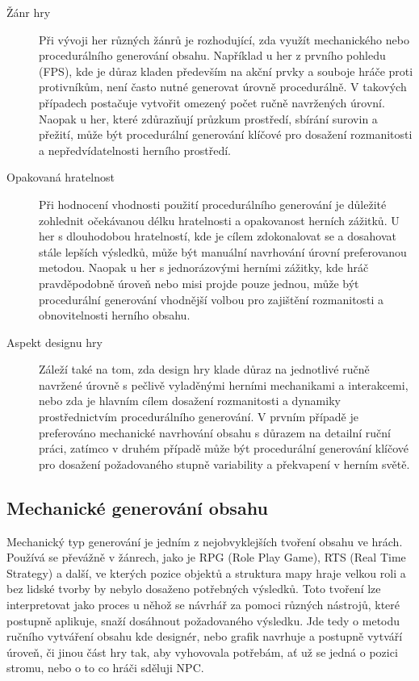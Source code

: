 \begin{description}
\item[Žánr hry] Při vývoji her různých žánrů je rozhodující, zda využít mechanického nebo procedurálního generování obsahu. Například u her z prvního pohledu (FPS), kde je důraz kladen především na akční prvky a souboje hráče proti protivníkům, není často nutné generovat úrovně procedurálně. V takových případech postačuje vytvořit omezený počet ručně navržených úrovní. Naopak u her, které zdůrazňují průzkum prostředí, sbírání surovin a přežití, může být procedurální generování klíčové pro dosažení rozmanitosti a nepředvídatelnosti herního prostředí.

\item[Opakovaná hratelnost] Při hodnocení vhodnosti použití procedurálního generování je důležité zohlednit očekávanou délku hratelnosti a opakovanost herních zážitků. U her s dlouhodobou hratelností, kde je cílem zdokonalovat se a dosahovat stále lepších výsledků, může být manuální navrhování úrovní preferovanou metodou. Naopak u her s jednorázovými herními zážitky, kde hráč pravděpodobně úroveň nebo misi projde pouze jednou, může být procedurální generování vhodnější volbou pro zajištění rozmanitosti a obnovitelnosti herního obsahu.

\item[Aspekt designu hry] Záleží také na tom, zda design hry klade důraz na jednotlivé ručně navržené úrovně s pečlivě vyladěnými herními mechanikami a interakcemi, nebo zda je hlavním cílem dosažení rozmanitosti a dynamiky prostřednictvím procedurálního generování. V prvním případě je preferováno mechanické navrhování obsahu s důrazem na detailní ruční práci, zatímco v druhém případě může být procedurální generování klíčové pro dosažení požadovaného stupně variability a překvapení v herním světě.
\end{description}

\subsection{Mechanické generování obsahu}
\label{traditional}
Mechanický typ generování je jedním z nejobvyklejších tvoření obsahu ve hrách. Používá se převážně v žánrech, jako je RPG (Role Play Game), RTS (Real Time Strategy) a další, ve kterých pozice objektů a struktura mapy hraje velkou roli a bez lidské tvorby by nebylo dosaženo potřebných výsledků. Toto tvoření lze interpretovat jako proces u něhož se návrhář za pomoci různých nástrojů, které postupně aplikuje, snaží dosáhnout požadovaného výsledku. Jde tedy o metodu ručního vytváření obsahu kde designér, nebo grafik navrhuje a postupně vytváří úroveň, či jinou část hry tak, aby vyhovovala potřebám, ať už se jedná o pozici stromu, nebo o to co hráči sděluji NPC.

